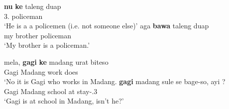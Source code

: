 \begin{exe}\ex\label{WasFOCNomPred}
\begin{xlist}
\ex\gll \textbf{nu} \textbf{ke} {taleng duap}\\
3\sg{}.\pronoun{} \nom{} policeman\\
\glt `He is a a policemen (i.e. not someone else)'
\ex\gll aga \textbf{bawa} {taleng duap}\\
my brother policeman\\
\glt `My brother is a policeman.'
\end{xlist}
\end{exe}

\begin{exe}\ex\label{WasFOCQ}
\begin{xlist}
\ex\gll mela, \textbf{gagi} \textbf{ke} madang urat biteso\\
\Neg{} Gagi \nom{} Madang work does\\
\glt `No it is Gagi who works in Madang. %
\ex\gll \textbf{gagi} madang sule se bage-so, ayi ?\\
Gagi Madang school at stay-\prs{}.3\sg{} \question{}\\
\glt `Gagi is at school in Madang, isn't he?' %
\end{xlist}
\end{exe}

